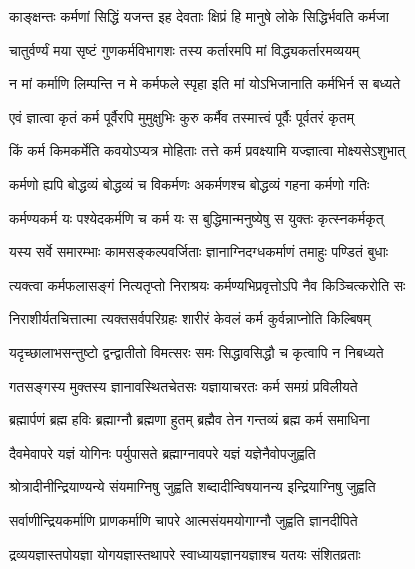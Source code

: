 \twolineshloka
{काङ्क्षन्तः कर्मणां सिद्धिं यजन्त इह देवताः}
{क्षिप्रं हि मानुषे लोके सिद्धिर्भवति कर्मजा}%

\twolineshloka
{चातुर्वर्ण्यं मया सृष्टं गुणकर्मविभागशः}
{तस्य कर्तारमपि मां विद्ध्यकर्तारमव्ययम्}%

\twolineshloka
{न मां कर्माणि लिम्पन्ति न मे कर्मफले स्पृहा}
{इति मां योऽभिजानाति कर्मभिर्न स बध्यते}%

\twolineshloka
{एवं ज्ञात्वा कृतं कर्म पूर्वैरपि मुमुक्षुभिः}
{कुरु कर्मैव तस्मात्त्वं पूर्वैः पूर्वतरं कृतम्}%

\twolineshloka
{किं कर्म किमकर्मेति कवयोऽप्यत्र मोहिताः}
{तत्ते कर्म प्रवक्ष्यामि यज्ज्ञात्वा मोक्ष्यसेऽशुभात्}%

\twolineshloka
{कर्मणो ह्यपि बोद्धव्यं बोद्धव्यं च विकर्मणः}
{अकर्मणश्च बोद्धव्यं गहना कर्मणो गतिः}%

\twolineshloka
{कर्मण्यकर्म यः पश्येदकर्मणि च कर्म यः}
{स बुद्धिमान्मनुष्येषु स युक्तः कृत्स्नकर्मकृत्}%

\twolineshloka
{यस्य सर्वे समारम्भाः कामसङ्कल्पवर्जिताः}
{ज्ञानाग्निदग्धकर्माणं तमाहुः पण्डितं बुधाः}%

\twolineshloka
{त्यक्त्वा कर्मफलासङ्गं नित्यतृप्तो निराश्रयः}
{कर्मण्यभिप्रवृत्तोऽपि नैव किञ्चित्करोति सः}%

\twolineshloka
{निराशीर्यतचित्तात्मा त्यक्तसर्वपरिग्रहः}
{शारीरं केवलं कर्म कुर्वन्नाप्नोति किल्बिषम्}%

\twolineshloka
{यदृच्छालाभसन्तुष्टो द्वन्द्वातीतो विमत्सरः}
{समः सिद्धावसिद्धौ च कृत्वापि न निबध्यते}%

\twolineshloka
{गतसङ्गस्य मुक्तस्य ज्ञानावस्थितचेतसः}
{यज्ञायाचरतः कर्म समग्रं प्रविलीयते}%

\twolineshloka
{ब्रह्मार्पणं ब्रह्म हविः ब्रह्माग्नौ ब्रह्मणा हुतम्}
{ब्रह्मैव तेन गन्तव्यं ब्रह्म कर्म समाधिना}%

\twolineshloka
{दैवमेवापरे यज्ञं योगिनः पर्युपासते}
{ब्रह्माग्नावपरे यज्ञं यज्ञेनैवोपजुह्वति}%

\twolineshloka
{श्रोत्रादीनीन्द्रियाण्यन्ये संयमाग्निषु जुह्वति}
{शब्दादीन्विषयानन्य इन्द्रियाग्निषु जुह्वति}%

\twolineshloka
{सर्वाणीन्द्रियकर्माणि प्राणकर्माणि चापरे}
{आत्मसंयमयोगाग्नौ जुह्वति ज्ञानदीपिते}%

\twolineshloka
{द्रव्ययज्ञास्तपोयज्ञा योगयज्ञास्तथापरे}
{स्वाध्यायज्ञानयज्ञाश्च यतयः संशितव्रताः}%

